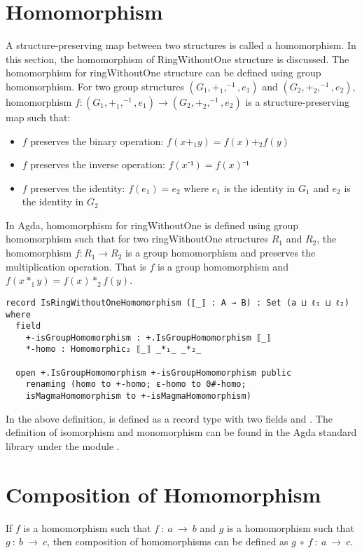 \section{Homomorphism} 
A structure-preserving map between two structures is called a homomorphism. In
this section, the homomorphism of RingWithoutOne structure is discussed. The
homomorphism for ringWithoutOne structure can be defined using group
homomorphism. For two group structures $(G_1,+_1,^{-1},e_1)$ and
$(G_2,+_2,^{-1},e_2)$, homomorphism $f:(G_1,+_1,^{-1},e_1) \rightarrow
(G_2,+_2,^{-1},e_2)$ is a structure-preserving map such that:
\begin{itemize}
  \item $f$ preserves the binary operation: $f(x +_1 y) = f(x) +_2 f(y)$
  \item $f$ preserves the inverse operation: $f(x⁻¹) = f(x)⁻¹$
  \item $f$ preserves the identity: $f(e_1) = e_2$ where $e_1$ is the identity
  in $G_1$ and $e_2$ is the identity in $G_2$
\end{itemize}
In Agda, homomorphism for ringWithoutOne is defined using group homomorphism
such that for two ringWithoutOne structures $R_1$ and $R_2$, the homomorphism
$f: R_1 \rightarrow R_2$ is a group homomorphism and preserves the
multiplication operation. That is $f$ is a group homomorphism and \(f(x *_1 y) =
f(x) *_2 f(y)\).

\begin{verbatim}
record IsRingWithoutOneHomomorphism (⟦_⟧ : A → B) : Set (a ⊔ ℓ₁ ⊔ ℓ₂) where
  field
    +-isGroupHomomorphism : +.IsGroupHomomorphism ⟦_⟧
    *-homo : Homomorphic₂ ⟦_⟧ _*₁_ _*₂_

  open +.IsGroupHomomorphism +-isGroupHomomorphism public
    renaming (homo to +-homo; ε-homo to 0#-homo;
    isMagmaHomomorphism to +-isMagmaHomomorphism)
\end{verbatim} 

In the above definition,  is defined as a
record type with two fields  and .
The definition of isomorphism and monomorphism can be found in the Agda standard
library under the module .

\section{Composition of Homomorphism}
If $f$ is a homomorphism such that $f\ :\ a \ \rightarrow \ b$ and $g$ is a
homomorphism such that $g\ :\ b\ \rightarrow \ c$, then composition of
homomorphisms can be defined as $g \ ∘\ f\ :\ a \ \rightarrow \ c$.

